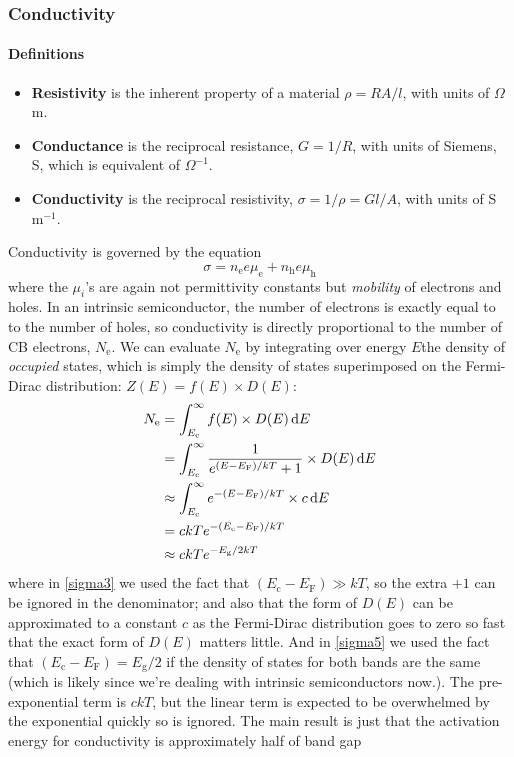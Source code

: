 \subsubsection{Conductivity}
\paragraph{Definitions}
\begin{itemize}
	\item \textbf{Resistivity} is the inherent property of a material $\rho=RA/l$, with units of $\Omega$ m.\par
	\item \textbf{Conductance} is the reciprocal resistance, $G=1/R$, with units of Siemens, S, which is equivalent of $\Omega^{-1}$.\par
	\item \textbf{Conductivity} is the reciprocal resistivity, $\sigma=1/\rho=Gl/A$, with units of S m$^{-1}$.\par
\end{itemize}
Conductivity is governed by the equation
\begin{equation}
	\sigma=n_{\mathrm{e}}e\mu_{\mathrm{e}}+n_{\mathrm{h}}e\mu_{\mathrm{h}}
\end{equation}
where the $\mu_i$'s are again not permittivity constants but \emph{mobility} of electrons and holes. In an intrinsic semiconductor, the number of electrons is exactly equal to to the number of holes, so conductivity is directly proportional to the number of CB electrons, $N_{\mathrm{e}}$. We can evaluate $N_{\mathrm{e}}$ by integrating over energy $E$the density of \emph{occupied} states, which is simply the density of states superimposed on the Fermi-Dirac distribution: $Z(E)=f(E)\times D(E)$:
\begin{subequations}
\begin{align}
N_{\mathrm{e}}&=\int^{\inf}_{E_{\mathrm{c}}}f(E)\times D(E)\dif E\\
&=\int^{\inf}_{E_{\mathrm{c}}}\frac{1}{e^{(E-E_{\mathrm{F}})/kT}+1}\times D(E)\dif E\\
&\approx\int^{\inf}_{E_{\mathrm{c}}}e^{-(E-E_{\mathrm{F}})/kT}\times c\dif E\label{sigma3}\\
&=ckTe^{-(E_{\mathrm{c}}-E_{\mathrm{F}})/kT}\\
&\approx ckTe^{-E_{\mathrm{g}}/2kT}\label{sigma5}
\end{align}
\end{subequations}
where in \cref{sigma3} we used the fact that $(E_{\mathrm{c}}-E_{\mathrm{F}})\gg kT$, so the extra $+1$ can be ignored in the denominator; and also that the form of $D(E)$ can be approximated to a constant $c$ as the Fermi-Dirac distribution goes to zero so fast that the exact form of $D(E)$ matters little. And in \cref{sigma5} we used the fact that $(E_{\mathrm{c}}-E_{\mathrm{F}})=E_{\mathrm{g}}/2$ if the density of states for both bands are the same (which is likely since we're dealing with intrinsic semiconductors now.). The pre-exponential term is $ckT$, but the linear term is expected to be overwhelmed by the exponential quickly so is ignored. The main result is just that the activation energy for conductivity is approximately half of band gap
